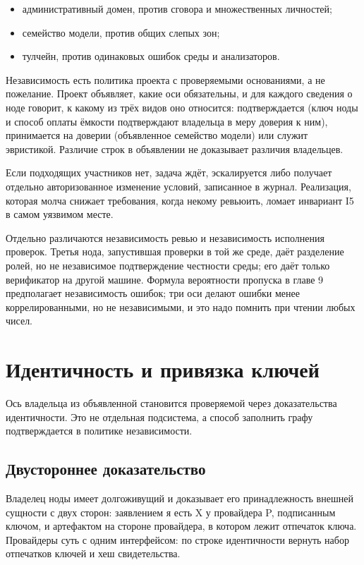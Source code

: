 \begin{itemize}
\item административный домен, против сговора и множественных личностей;
\item семейство модели, против общих слепых зон;
\item тулчейн, против одинаковых ошибок среды и анализаторов.
\end{itemize}

Независимость есть политика проекта с проверяемыми основаниями, а не пожелание. Проект объявляет, какие оси обязательны, и для каждого сведения о ноде говорит, к какому из трёх видов оно относится: подтверждается (ключ ноды и способ оплаты ёмкости подтверждают владельца в меру доверия к ним), принимается на доверии (объявленное семейство модели) или служит эвристикой. Различие строк в объявлении не доказывает различия владельцев.

\begin{warnbox}
Если подходящих участников нет, задача ждёт, эскалируется либо получает отдельно авторизованное изменение условий, записанное в журнал. Реализация, которая молча снижает требования, когда некому ревьюить, ломает инвариант I5 в самом уязвимом месте.
\end{warnbox}

Отдельно различаются независимость ревью и независимость исполнения проверок. Третья нода, запустившая проверки в той же среде, даёт разделение ролей, но не независимое подтверждение честности среды; его даёт только верификатор на другой машине. Формула вероятности пропуска в главе 9 предполагает независимость ошибок; три оси делают ошибки менее коррелированными, но не независимыми, и это надо помнить при чтении любых чисел.

\section{Идентичность и привязка ключей}

Ось владельца из объявленной становится проверяемой через доказательства идентичности. Это не отдельная подсистема, а способ заполнить графу подтверждается в политике независимости.

\subsection{Двустороннее доказательство}

Владелец ноды имеет долгоживущий  и доказывает его принадлежность внешней сущности с двух сторон: заявлением я есть X у провайдера P, подписанным ключом, и артефактом на стороне провайдера, в котором лежит отпечаток ключа. Провайдеры суть  с одним интерфейсом: по строке идентичности вернуть набор отпечатков ключей и хеш свидетельства.

